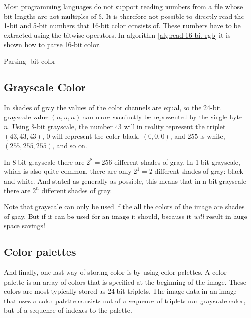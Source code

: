 Most programming languages do not support reading numbers from a file
whose bit lengths are not multiples of 8. It is therefore not possible
to directly read the 1-bit and 5-bit numbers that 16-bit color
consists of. These numbers have to be extracted using the bitwise
operators. In algorithm \ref{alg:read-16-bit-rgb} it is shown how to
parse 16-bit color.

\begin{algorithm}[H]
  \caption{Parsing -bit color}\algohack{}
  \label{alg:read-16-bit-rgb}
  \begin{algorithmic}[1]
  \end{algorithmic}
\end{algorithm}

\subsection{Grayscale Color}
\label{sec:grayscale-color}

\newcommand{\selfrgbtrip}[3]{\mbox{\textcolor[RGB]{#1,#2,#3}{(#1,#2,#3)}}}
\newcommand{\selfrgbtripgray}[1]{\selfrgbtrip{#1}{#1}{#1}}

In shades of gray the values of the color channels are equal, so the
24-bit grayscale value $(n,n,n)$ can more succinctly be represented by
the single byte $n$. Using 8-bit grayscale, the number $43$ will in
reality represent the triplet $(43,43,43)$, $0$ will represent the
color black, $(0,0,0)$, and $255$ is white, $(255,255,255)$, and so
on.

In 8-bit grayscale there are $2^8 = 256$ different shades of gray. In
1-bit grayscale, which is also quite common, there are only $2^1 = 2$
different shades of gray: black and white. And stated as generally as
possible, this means that in n-bit grayscale there are $2^n$ different
shades of gray.

Note that grayscale can only be used if the all the colors of the
image are shades of gray. But if it can be used for an image it
should, because it \textit{will} result in huge space savings!

\subsection{Color palettes}

And finally, one last way of storing color is by using color
palettes. A color palette is an array of colors that is specified at
the beginning of the image. These colors are most typically stored as
24-bit \rgb triplets. The image data in an image that uses a color
palette consists not of a sequence of triplets nor grayscale
color, but of a sequence of indexes to the palette.

